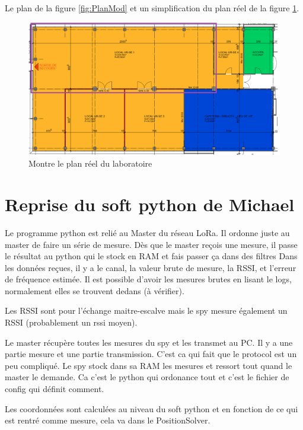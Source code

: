 Le plan de la figure \ref{fig:PlanMod} et un simplification du plan réel de la figure \ref{fig:PlanRe}.

\begin{figure}[H]
	\begin{center}
		\includegraphics[scale=0.5]{figures/PlanRe.PNG}
		\caption{Montre le plan réel du laboratoire}
		\label{fig:PlanRe} %
	\end{center}
\end{figure}

\section{Reprise du soft python de Michael}
Le programme python est relié au Master du réseau LoRa. Il ordonne juste au master de faire un série de mesure. Dès que le master reçois une mesure, il passe le résultat au python qui le stock en RAM et fais passer ça dans des filtres Dans les données reçues, il y a le canal, la valeur brute de mesure, la RSSI, et l'erreur de fréquence estimée. Il est possible d'avoir les mesures brutes en lisant le logs, normalement elles se trouvent dedans (à vérifier).

Les RSSI sont pour l'échange maitre-escalve mais le spy mesure également un RSSI (probablement un rssi moyen).

Le master récupère toutes les mesures du spy et les transmet au PC. Il y a une partie mesure et une partie transmission. C'est ca qui fait que le protocol est un peu compliqué. Le spy stock dans sa RAM les mesures et ressort tout quand le master le demande. Ca c'est le python qui ordonance tout et c'est le fichier de config qui définit comment.

Les coordonnées sont calculées au niveau du soft python et en fonction de ce qui est rentré comme mesure, cela va dans le PositionSolver.

